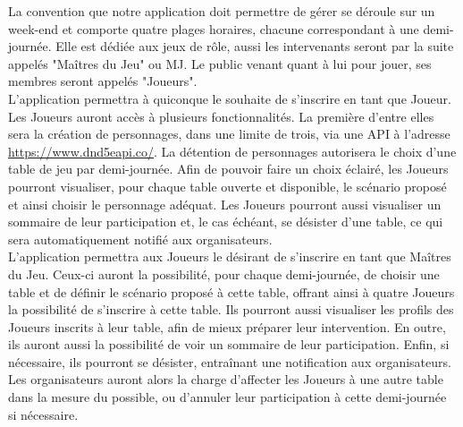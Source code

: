 \documentclass[11pt]{article}
\begin{document}
La convention que notre application doit permettre de gérer se déroule sur un week-end et comporte quatre plages horaires, chacune correspondant à une demi-journée. Elle est dédiée aux jeux de rôle, aussi les intervenants seront par la suite appelés "Maîtres du Jeu" ou MJ. Le public venant quant à lui pour jouer, ses membres seront appelés "Joueurs".\\ 

L'application permettra à quiconque le souhaite de s'inscrire en tant que Joueur. Les Joueurs auront accès à plusieurs fonctionnalités. La première d'entre elles sera la création de personnages, dans une limite de trois, via une API à l'adresse \textcolor{blue}{\href{https://www.dnd5eapi.co/}{https://www.dnd5eapi.co/}}. La détention de personnages autorisera le choix d'une table de jeu par demi-journée. Afin de pouvoir faire un choix éclairé, les Joueurs pourront visualiser, pour chaque table ouverte et disponible, le scénario proposé et ainsi choisir le personnage adéquat. Les Joueurs pourront aussi visualiser un sommaire de leur participation et, le cas échéant, se désister d'une table, ce qui sera automatiquement notifié aux organisateurs.\\

L'application permettra aux Joueurs le désirant de s'inscrire en tant que Maîtres du Jeu. Ceux-ci auront la possibilité, pour chaque demi-journée, de choisir une table  et de définir le scénario proposé à cette table, offrant ainsi à quatre Joueurs la possibilité de s'inscrire à cette table. Ils pourront aussi visualiser les profils des Joueurs inscrits à leur table, afin de mieux préparer leur intervention. En outre, ils auront aussi la possibilité de voir un sommaire de leur participation. Enfin, si nécessaire, ils pourront se désister, entraînant une notification aux organisateurs. Les organisateurs auront alors la charge d'affecter les Joueurs à une autre table dans la mesure du possible, ou d'annuler leur participation à cette demi-journée si nécessaire.\\
\end{document}
